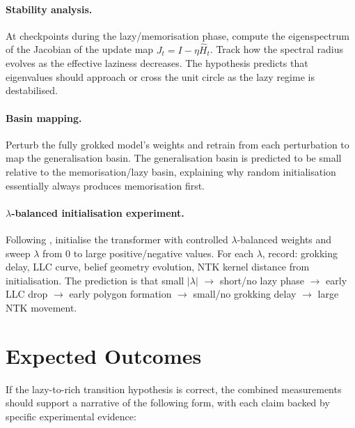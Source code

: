 \documentclass[11pt,a4paper]{article}
\begin{document}
\paragraph{Stability analysis.} At checkpoints during the lazy/memorisation phase, compute the eigenspectrum of the Jacobian of the update map $J_t = I - \eta \hat{H}_t$. Track how the spectral radius evolves as the effective laziness decreases. The hypothesis predicts that eigenvalues should approach or cross the unit circle as the lazy regime is destabilised.

\paragraph{Basin mapping.} Perturb the fully grokked model's weights and retrain from each perturbation to map the generalisation basin. The generalisation basin is predicted to be small relative to the memorisation/lazy basin, explaining why random initialisation essentially always produces memorisation first.

\paragraph{$\lambda$-balanced initialisation experiment.} Following \citet{domine2025lazy}, initialise the transformer with controlled $\lambda$-balanced weights and sweep $\lambda$ from 0 to large positive/negative values. For each $\lambda$, record: grokking delay, LLC curve, belief geometry evolution, NTK kernel distance from initialisation. The prediction is that small $|\lambda|$ $\to$ short/no lazy phase $\to$ early LLC drop $\to$ early polygon formation $\to$ small/no grokking delay $\to$ large NTK movement.

\section{Expected Outcomes}

If the lazy-to-rich transition hypothesis is correct, the combined measurements should support a narrative of the following form, with each claim backed by specific experimental evidence:
\end{document}
